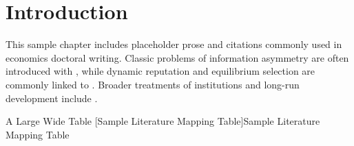 \section{Introduction}
This sample chapter includes placeholder prose and citations commonly used in economics doctoral writing. Classic problems of information asymmetry are often introduced with \citet{akerlof1970lemons}, while dynamic reputation and equilibrium selection are commonly linked to \citet{krepswilson1982}. Broader treatments of institutions and long-run development include \citet{acemoglu2001colonial}.

\clearpage
\begin{landscape}
\thispagestyle{empty}
\landscapepageno
\noindent
\begin{minipage}[c][6.35in][c]{9in}
\centering
\huge A Large Wide Table
\vspace{0.3em}
\captionsetup{type=table,hypcap=false}
[Sample Literature Mapping Table]{Sample Literature Mapping Table}
\label{tab:table1_conceptual}
\end{minipage}
\end{landscape}
\clearpage
